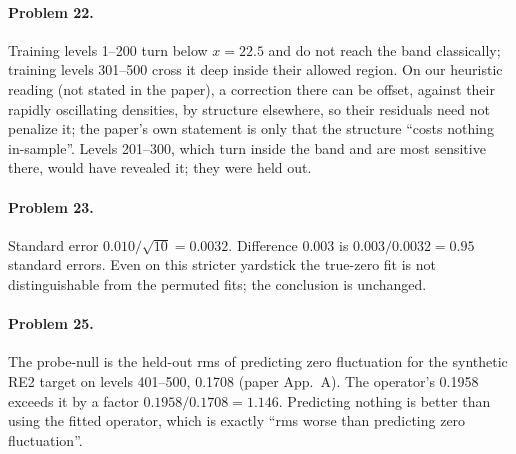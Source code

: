 \paragraph{Problem 22.} Training levels 1--200 turn below $x=22.5$ and do not reach the band classically; training levels 301--500 cross it deep inside their allowed region. On our heuristic reading (not stated in the paper), a correction there can be offset, against their rapidly oscillating densities, by structure elsewhere, so their residuals need not penalize it; the paper's own statement is only that the structure ``costs nothing in-sample''. Levels 201--300, which turn inside the band and are most sensitive there, would have revealed it; they were held out.

\paragraph{Problem 23.} Standard error $0.010/\sqrt{10}=0.0032$. Difference $0.003$ is $0.003/0.0032=0.95$ standard errors. Even on this stricter yardstick the true-zero fit is not distinguishable from the permuted fits; the conclusion is unchanged.

\paragraph{Problem 25.} The probe-null is the held-out rms of predicting zero fluctuation for the synthetic RE2 target on levels 401--500, 0.1708 (paper App.~A). The operator's 0.1958 exceeds it by a factor $0.1958/0.1708=1.146$. Predicting nothing is better than using the fitted operator, which is exactly ``rms worse than predicting zero fluctuation''.
